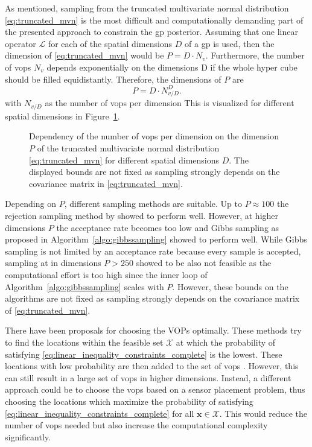 As mentioned, sampling from the truncated multivariate normal distribution \eqref{eq:truncated_mvn} is the most difficult and computationally demanding part of the presented approach to constrain the \gls{gp} posterior. Assuming that one linear operator $\mathcal{L}$ for each of the spatial dimensions $D$ of a \gls{gp} is used, then the dimension of \eqref{eq:truncated_mvn} would be $P = D \cdot N_v$. Furthermore, the number of \glspl{vop} $N_v$ depends exponentially on the dimensions D if the whole hyper cube should be filled equidistantly. Therefore, the dimensions of $P$ are
\begin{equation}
    P = D \cdot N_{v/D}^D .
    \label{eq:scaling_of_P}    
\end{equation}
with $N_{v/D}$ as the number of \glspl{vop} per dimension 
This is visualized for different spatial dimensions in Figure~\ref{fig:dims_vops}.
\begin{figure}[t]
    \centering
    
    \caption[Dependency of the number of \glspl{vop} per dimension on the dimension $P$ of the truncated multivariate normal distribution.]{Dependency of the number of \glspl{vop} per dimension on the dimension $P$ of the truncated multivariate normal distribution \eqref{eq:truncated_mvn} for different spatial dimensions $D$. The displayed bounds are not fixed as sampling strongly depends on the covariance matrix in \eqref{eq:truncated_mvn}.}
   \label{fig:dims_vops}
\end{figure}
Depending on $P$, different sampling methods are suitable. Up to $P\approx 100$ the rejection sampling method by \textcite{Botev2016} showed to perform well. However, at higher dimensions $P$ the acceptance rate becomes too low and Gibbs sampling as proposed in Algorithm~\ref{algo:gibbssampling} showed to perform well. While Gibbs sampling is not limited by an acceptance rate because every sample is accepted, sampling at in dimensions $P>250$ showed to be also not feasible as the computational effort is too high since the inner loop of Algorithm~\ref{algo:gibbssampling} scales with $P$. However, these bounds on the algorithms are not fixed as sampling strongly depends on the covariance matrix of \eqref{eq:truncated_mvn}. 

There have been proposals for choosing the VOPs optimally. These methods try to find the locations within the feasible set $\mathcal{X}$ at which the probability of satisfying \eqref{eq:linear_inequality_constraints_complete} is the lowest. These locations with low probability are then added to the set of \glspl{vop} \cite{Agrell_2019}\cite{Wang_2016}. However, this can still result in a large set of \glspl{vop} in higher dimensions. Instead, a different approach could be to choose the \glspl{vop} based on a sensor placement problem, thus choosing the locations which maximize the probability of satisfying \eqref{eq:linear_inequality_constraints_complete} for all $\mathbf{x} \in \mathcal{X}$. This would reduce the number of \glspl{vop} needed but also increase the computational complexity significantly. 

